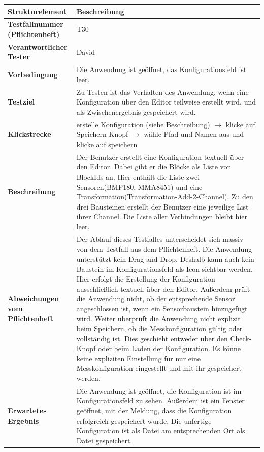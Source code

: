 \documentclass[parskip=full]{scrartcl}
\begin{document}
\begin{table}[h]
\begin{tabular}{| p{4cm} | p{10cm} |}
	\hline
	\textbf{Strukturelement} & \textbf{Beschreibung} \\ \hline
	\textbf{Testfallnummer (Pflichtenheft)}
	& 
	T30
	\\ \hline
	\textbf{Verantwortlicher Tester}
	& 
	David
	\\ \hline
	\textbf{Vorbedingung}
	& 
	Die Anwendung ist geöffnet, das Konfigurationsfeld ist leer.
	\\ \hline
	\textbf{ Testziel}
	& 
	Zu Testen ist das Verhalten des Anwendung, wenn eine Konfiguration über den Editor teilweise erstellt wird, und als Zwischenergebnis gespeichert wird.
	\\ \hline
	
	\textbf{Klickstrecke}
	& 
	erstelle Konfiguration (siehe Beschreibung) $\rightarrow$ klicke auf Speichern-Knopf $\rightarrow$ wähle Pfad und Namen aus und klicke auf speichern
	\\ \hline
	
	\textbf{ Beschreibung}
	& 
	Der Benutzer erstellt eine Konfiguration textuell über den Editor. Dabei gibt er die Blöcke als Liste von BlockIds an. Hier enthält die Liste zwei Sensoren(BMP180, MMA8451) und eine Transformation(Transformation-Add-2-Channel). Zu den drei Bausteinen erstellt der Benutzer eine jeweilige List ihrer Channel. Die Liste aller Verbindungen bleibt hier leer.
	\\ \hline
	
	\textbf{Abweichungen vom Pflichtenheft}
	& 
	Der Ablauf dieses Testfalles unterscheidet sich massiv von dem Testfall aus dem Pflichtenheft. Die Anwendung unterstützt kein Drag-and-Drop. Deshalb kann auch kein Baustein im Konfigurationsfeld als Icon sichtbar werden. Hier erfolgt die Erstellung der Konfiguration ausschließlich textuell über den Editor. Außerdem prüft die Anwendung nicht, ob der entsprechende Sensor angeschlossen ist, wenn ein Sensorbaustein hinzugefügt wird. Weiter überprüft die Anwendung nicht explizit beim Speichern, ob die Messkonfiguration gültig oder vollständig ist. Dies geschieht entweder über den Check-Knopf oder beim Laden der Konfiguration. Es könne keine expliziten Einstellung für nur eine Messkonfiguration eingestellt und mit ihr gespeichert werden. 

	\\ \hline
	
	\textbf{Erwartetes Ergebnis}
	& 
	Die Anwendung ist geöffnet, die Konfiguration ist im Konfigurationsfeld zu sehen. Außerdem ist ein Fenster geöffnet, mit der Meldung, dass die Konfiguration erfolgreich gespeichert wurde.	Die unfertige Konfiguration ist als Datei am entsprechenden Ort als Datei gespeichert. 
	\\ \hline
			

\end{tabular}
\end{table}
\end{document}
